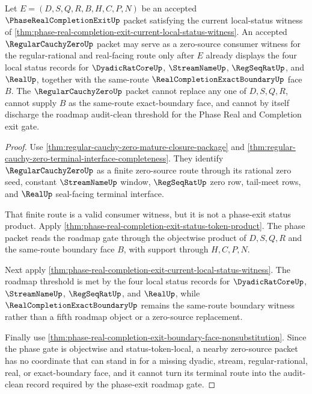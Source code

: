 \begin{theorem}
\label{thm:phase-real-completion-exit-zero-source-nonsubstitution}
Let $E=(D,S,Q,R,B,H,C,P,N)$ be an accepted $\PhaseRealCompletionExitUp$ packet satisfying the current local-status witness of \autoref{thm:phase-real-completion-exit-current-local-status-witness}. An accepted $\RegularCauchyZeroUp$ packet may serve as a zero-source consumer witness for the regular-rational and real-facing route only after $E$ already displays the four local status records for $\DyadicRatCoreUp$, $\StreamNameUp$, $\RegSeqRatUp$, and $\RealUp$, together with the same-route $\RealCompletionExactBoundaryUp$ face $B$. The $\RegularCauchyZeroUp$ packet cannot replace any one of $D,S,Q,R$, cannot supply $B$ as the same-route exact-boundary face, and cannot by itself discharge the roadmap audit-clean threshold for the Phase Real and Completion exit gate.
\end{theorem}
\begin{proof}
Use \autoref{thm:regular-cauchy-zero-mature-closure-package} and \autoref{thm:regular-cauchy-zero-terminal-interface-completeness}. They identify $\RegularCauchyZeroUp$ as a finite zero-source route through its rational zero seed, constant $\StreamNameUp$ window, $\RegSeqRatUp$ zero row, tail-meet rows, and $\RealUp$ seal-facing terminal interface.

That finite route is a valid consumer witness, but it is not a phase-exit status product. Apply \autoref{thm:phase-real-completion-exit-status-token-product}. The phase packet reads the roadmap gate through the objectwise product of $D,S,Q,R$ and the same-route boundary face $B$, with support through $H,C,P,N$.

Next apply \autoref{thm:phase-real-completion-exit-current-local-status-witness}. The roadmap threshold is met by the four local status records for $\DyadicRatCoreUp$, $\StreamNameUp$, $\RegSeqRatUp$, and $\RealUp$, while $\RealCompletionExactBoundaryUp$ remains the same-route boundary witness rather than a fifth roadmap object or a zero-source replacement.

Finally use \autoref{thm:phase-real-completion-exit-boundary-face-nonsubstitution}. Since the phase gate is objectwise and status-token-local, a nearby zero-source packet has no coordinate that can stand in for a missing dyadic, stream, regular-rational, real, or exact-boundary face, and it cannot turn its terminal route into the audit-clean record required by the phase-exit roadmap gate.
\end{proof}

